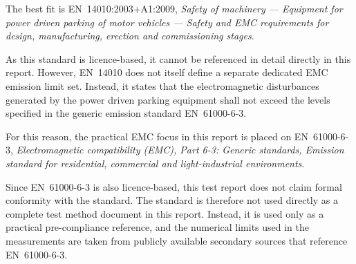 The best fit is EN~14010:2003+A1:2009, \textit{Safety of machinery --- Equipment for power driven parking of motor vehicles --- Safety and EMC requirements for design, manufacturing, erection and commissioning stages}.

As this standard is licence-based, it cannot be referenced in detail directly in this
report. However, EN~14010 does not itself define a separate dedicated EMC emission
limit set. Instead, it states that the electromagnetic disturbances generated by the power
driven parking equipment shall not exceed the levels specified in the generic emission
standard EN~61000-6-3.

For this reason, the practical EMC focus in this report is placed on
EN~61000-6-3, \textit{Electromagnetic compatibility (EMC), Part 6-3: Generic standards,
Emission standard for residential, commercial and light-industrial environments}.

Since EN~61000-6-3 is also licence-based, this test report does not claim formal
conformity with the standard. The standard is therefore not used directly as a complete
test method document in this report. Instead, it is used only as a practical
pre-compliance reference, and the numerical limits used in the measurements are taken
from publicly available secondary sources that reference EN~61000-6-3.

